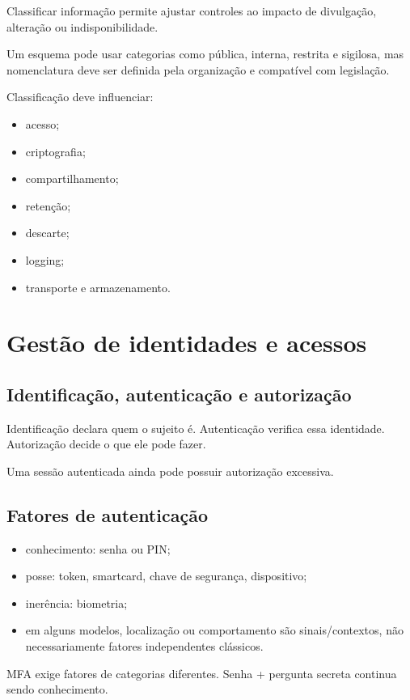 Classificar informação permite ajustar controles ao impacto de divulgação, alteração ou indisponibilidade.

Um esquema pode usar categorias como pública, interna, restrita e sigilosa, mas nomenclatura deve ser definida pela organização e compatível com legislação.

Classificação deve influenciar:
\begin{itemize}
\item acesso;
\item criptografia;
\item compartilhamento;
\item retenção;
\item descarte;
\item logging;
\item transporte e armazenamento.
\end{itemize}

\section{Gestão de identidades e acessos}

\subsection{Identificação, autenticação e autorização}

Identificação declara quem o sujeito é. Autenticação verifica essa identidade. Autorização decide o que ele pode fazer.

Uma sessão autenticada ainda pode possuir autorização excessiva.

\subsection{Fatores de autenticação}

\begin{itemize}
\item conhecimento: senha ou PIN;
\item posse: token, smartcard, chave de segurança, dispositivo;
\item inerência: biometria;
\item em alguns modelos, localização ou comportamento são sinais/contextos, não necessariamente fatores independentes clássicos.
\end{itemize}

MFA exige fatores de categorias diferentes. Senha + pergunta secreta continua sendo conhecimento.

